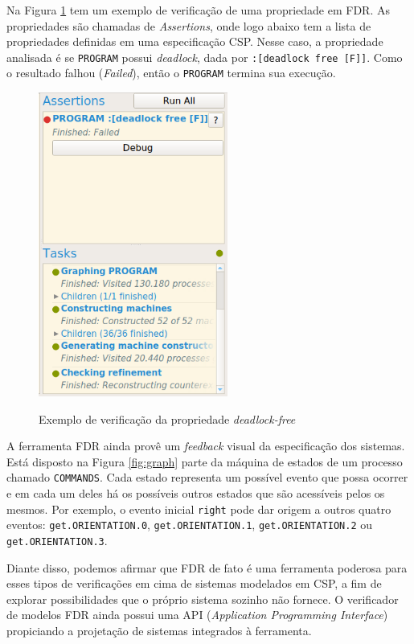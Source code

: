 Na Figura \ref{fig:assertion} tem um exemplo de verificação de uma propriedade em FDR. As propriedades são chamadas de \textit{Assertions}, onde logo abaixo tem a lista de propriedades definidas em uma especificação CSP. Nesse caso, a propriedade analisada é se \texttt{PROGRAM} possui \textit{deadlock}, dada por \texttt{:[deadlock free [F]]}. Como o resultado falhou (\textit{Failed}), então o \texttt{PROGRAM} termina sua execução.

\begin{figure}[h]
\centering
\caption{Exemplo de verificação da propriedade \textit{deadlock-free}}
\includegraphics[height=10cm]{figuras/assertion.png}
\label{fig:assertion}
\end{figure}

A ferramenta FDR ainda provê um \textit{feedback} visual da especificação dos sistemas. Está disposto na Figura \ref{fig:graph} parte da máquina de estados de um processo chamado \texttt{COMMANDS}. Cada estado representa um possível evento que possa ocorrer e em cada um deles há os possíveis outros estados que são acessíveis pelos os mesmos. Por exemplo, o evento inicial \texttt{right} pode dar origem a outros quatro eventos: \texttt{get.ORIENTATION.0}, \texttt{get.ORIENTATION.1}, \texttt{get.ORIENTATION.2} ou \texttt{get.ORIENTATION.3}.

Diante disso, podemos afirmar que FDR de fato é uma ferramenta poderosa para esses tipos de verificações em cima de sistemas modelados em CSP, a fim de explorar possibilidades que o próprio sistema sozinho não fornece. O verificador de modelos FDR ainda possui uma API (\textit{Application Programming Interface}) propiciando a projetação de sistemas integrados à ferramenta.

